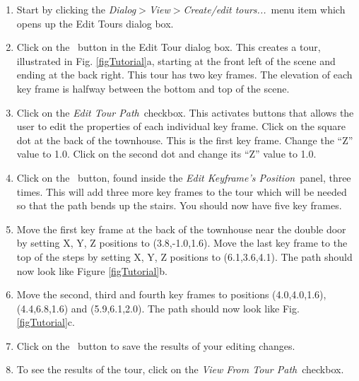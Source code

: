 \documentclass[11pt,twoside]{book}
\newcommand{\frameit}[1]{\fbox{\tt #1}}
\begin{document}
\begin{enumerate}
\item Start by clicking the {\em Dialog$>$View$>$Create/edit tours...}\ menu item
which opens up the Edit Tours dialog box.

\item  Click on the \frameit{New Tour}\ button in the Edit Tour dialog
box. This creates a tour, illustrated in Fig.
\ref{figTutorial}a, starting at the front left of the scene and
ending at the back right. This tour has two key frames.  The
elevation of each key frame is halfway between the bottom and top
of the scene.

\item Click on the {\em Edit Tour Path}\ checkbox. This activates
buttons that allows the user to edit the properties of each
individual key frame. Click on the square dot at the back of the
townhouse. This is the first key frame. Change the ``Z'' value to
1.0.  Click on the second dot and change its ``Z'' value to 1.0.


\item  Click on the \frameit{Add}\ button, found inside the {\em Edit
Keyframe's Position}\ panel, three times. This will add three more
key frames to the tour which will be needed so that the path bends
up the stairs. You should now have five key frames.

\item Move the first key frame at the back of the townhouse near the
double door by setting X, Y, Z positions to (3.8,-1.0,1.6).
Move the last key frame to the top
of the steps by setting X, Y, Z positions to (6.1,3.6,4.1).
The path should now look like
Figure \ref{figTutorial}b.

\item Move the second, third and fourth key frames to positions
(4.0,4.0,1.6), (4.4,6.8,1.6) and (5.9,6.1,2.0).  The path should
now look like Fig. \ref{figTutorial}c.

\item Click on the \frameit{Save Settings}\ button to save the results
of your editing changes.

\item To see the results of the tour, click on the {\em View From
Tour Path}\ checkbox.
\end{enumerate}

\end{document}
